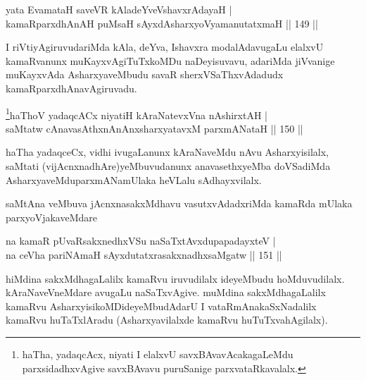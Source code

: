 
\begin{shl}
yata EvamataH saveVR kAladeYveVshavxrAdayaH |\\
kamaRparxdhAnAH puMsaH sAyxdAsharxyoV\s yamanutatxmaH \hfill || 149 ||
\end{shl}

\begin{artha}
I riVtiyAgiruvudariMda kAla, deYva, Ishavxra modalAdavugaLu elalxvU kamaRvanunx muKayxvAgiTuTxkoMDu naDeyisuvavu, adariMda jiVvanige muKayxvAda AsharxyaveMbudu savaR sherxVSaThxvAdadudx kamaRparxdhAnavAgiruvadu.
\end{artha}

\begin{shl}
\footnote{haTha, yadaqcAcx, niyati I elalxvU savxBAvavAcakagaLeMdu parxsidadhxvAgive savxBAvavu puruSanige parxvataRkavalalx.}haThoV yadaqcACx niyatiH kAraNatevxVna nA\s \s shirxtAH |\\
saMtatw cAnavasAthxnAnAnx\s \s sharxyatavxM parxmANataH \hfill || 150 ||
\end{shl}

\begin{artha}
haTha yadaqceCx, vidhi ivugaLanunx kAraNaveMdu nAvu Asharxyisilalx, saMtati (vijAcnxnadhAre)yeMbuvudanunx anavasethxyeMba doVSadiMda AsharxyaveMdu\break parxmANamUlaka heVLalu sAdhayxvilalx.
\end{artha}


\begin{artha}
saMtAna veMbuva jAcnxnasakxMdhavu vasutxvAdadxriMda kamaRda mUlaka parxyoVjakaveMdare
\end{artha}

\begin{shl}
na kamaR pUvaRsakxnedhxVSu naSaTxtAvxdupapadayxteV |\\
na ceVha pariNAmaH sAyxdutatxrasakxnadhxsaMgatw \hfill || 151 ||
\end{shl}

\begin{artha}
hiMdina sakxMdhagaLalilx kamaRvu iruvudilalx ideyeMbudu hoMduvudilalx. kAraNaveVneMdare avugaLu naSaTxvAgive. muMdina sakxMdhagaLalilx kamaRvu AsharxyisikoMDideyeMbudAdarU I vataRmAnakaSxNadalilx kamaRvu huTaTxlAradu (Asharxyavilalxde kamaRvu huTuTxvahAgilalx).
\end{artha}

